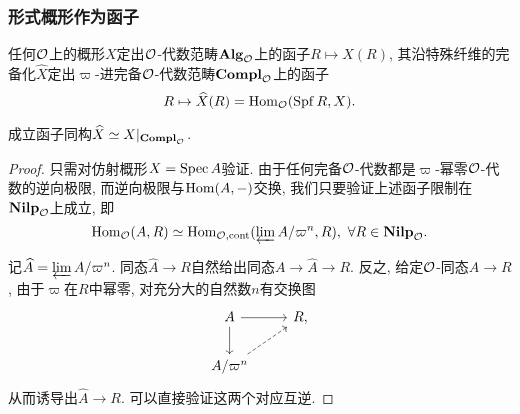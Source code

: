
\subsubsection{形式概形作为函子}\label{sec: formal scheme as functor}

任何$\O$上的概形$X$定出$\O$-代数范畴$\alg_\O$上的函子$R\mapsto X(R)$, 其沿特殊纤维的完备化$\hat{X}$定出$\varpi$-进完备$\O$-代数范畴$\compl$上的函子\[R\mapsto \hat{X}(R) = \Hom_\O(\spf R, X).\]

\begin{proposition}\label{fomal completion = restriction}
    成立函子同构$\hat{X} \simeq X|_{\compl}$.
\end{proposition}

\begin{proof}
    只需对仿射概形$X = \spec A$验证. 由于任何完备$\O$-代数都是$\varpi$-幂零$\O$-代数的逆向极限, 而逆向极限与$\Hom(A, -)$交换, 我们只要验证上述函子限制在$\nilp$上成立,
    即\[\Hom_{\O}(A, R) \simeq \Hom_{\O, \cont}(\varprojlim A/\varpi^n, R),\ \forall R\in\nilp.\]

    记$\hat{A} = \varprojlim A/\varpi^n$. 同态$\hat{A}\to R$自然给出同态$A \to\hat{A}\to R$.
    反之, 给定$\O$-同态$A\to R$, 由于$\varpi$在$R$中幂零, 对充分大的自然数$n$有交换图\[
    \begin{tikzcd}
    A \arrow[d] \arrow[r]         & R, \\
    A/\varpi^n \arrow[ru, dashed] &  
    \end{tikzcd}\]
    从而诱导出$\hat{A}\to R$. 可以直接验证这两个对应互逆.
\end{proof}



